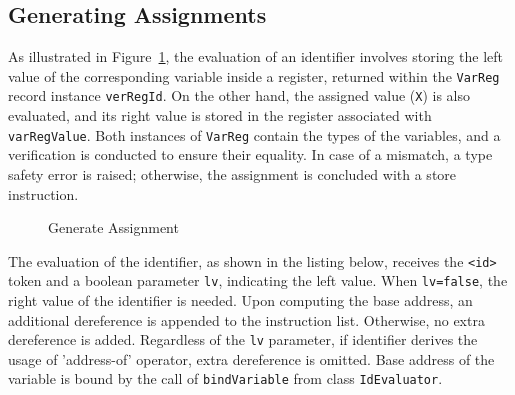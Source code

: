 \subsection{Generating Assignments}\label{subsec:generating_assignments}
As illustrated in Figure~\ref{fig:gen_assignment}, the evaluation of an identifier involves storing the left value of the corresponding variable inside a register,
returned within the \verb_VarReg_ record instance \verb+verRegId+.
On the other hand, the assigned value (\verb+X+) is also evaluated, and its right value is stored in the register associated with \verb+varRegValue+.
Both instances of \verb+VarReg+ contain the types of the variables, and a verification is conducted to ensure their equality.
In case of a mismatch, a type safety error is raised; otherwise, the assignment is concluded with a store instruction.
\begin{figure}[h]
\centering
{}
\caption{Generate Assignment}
\label{fig:gen_assignment}
\end{figure}

The evaluation of the identifier, as shown in the listing below, receives the
\verb+<id>+ token and a boolean parameter \verb+lv+, indicating the left value.
When \verb+lv=false+, the right value of the identifier is needed.
Upon computing the base address, an additional dereference is appended to the instruction list.
Otherwise, no extra dereference is added. Regardless of the \verb+lv+ parameter, if identifier
derives the usage of 'address-of' operator, extra dereference is omitted. Base address of the variable
is bound by the call of \verb+bindVariable+ from class \verb+IdEvaluator+.

